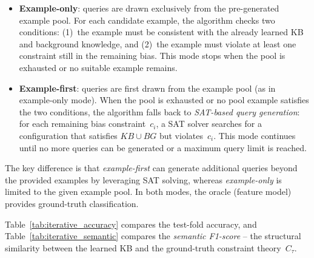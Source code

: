 \begin{itemize}
    \item \textbf{Example-only}: queries are drawn exclusively from the pre-generated example pool. For each candidate example, the algorithm checks two conditions: (1)~the example must be consistent with the already learned KB and background knowledge, and (2)~the example must violate at least one constraint still in the remaining bias. This mode stops when the pool is exhausted or no suitable example remains.
    \item \textbf{Example-first}: queries are first drawn from the example pool (as in example-only mode). When the pool is exhausted or no pool example satisfies the two conditions, the algorithm falls back to \textit{SAT-based query generation}: for each remaining bias constraint~$c_i$, a SAT solver searches for a configuration that satisfies $KB \cup BG$ but violates~$c_i$. This mode continues until no more queries can be generated or a maximum query limit is reached.
\end{itemize}

The key difference is that \textit{example-first} can generate additional queries beyond the provided examples by leveraging SAT solving, whereas \textit{example-only} is limited to the given example pool. In both modes, the oracle (feature model) provides ground-truth classification.

Table~\ref{tab:iterative_accuracy} compares the test-fold accuracy, and Table~\ref{tab:iterative_semantic} compares the \textit{semantic F1-score} -- the structural similarity between the learned KB and the ground-truth constraint theory~$C_\tau$.

